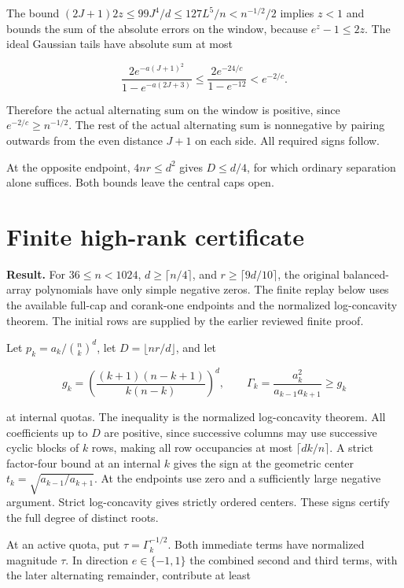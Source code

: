 \documentclass[11pt]{article}
\begin{document}
The bound $(2J+1)2z\le99J^4/d\le127L^5/n< n^{-1/2}/2$ implies $z<1$ and bounds the sum of the absolute errors on the window, because $e^z-1\le2z$. The ideal Gaussian tails have absolute sum at most

\begin{equation*}
\frac{2 e^{-a(J+1)^2}}{1-e^{-a(2J+3)}}\le \frac{2e^{-24/c}}{1-e^{-12}}< e^{-2/c}.
\end{equation*}

Therefore the actual alternating sum on the window is positive, since $e^{-2/c}\ge n^{-1/2}$. The rest of the actual alternating sum is nonnegative by pairing outwards from the even distance $J+1$ on each side. All required signs follow.

At the opposite endpoint, $4nr\le d^2$ gives $D\le d/4$, for which ordinary separation alone suffices. Both bounds leave the central caps open.

\section{Finite high-rank certificate}\label{sec:finite}

\textbf{Result.} For $36\le n<1024$, $d\ge\lceil n/4\rceil$, and $r\ge\lceil9d/10\rceil$, the original balanced-array polynomials have only simple negative zeros. The finite replay below uses the available full-cap and corank-one endpoints and the normalized log-concavity theorem. The initial rows are supplied by the earlier reviewed finite proof.

Let $p_k=a_k/\binom nk^d$, let $D=\lfloor nr/d\rfloor$, and let

\begin{equation*}
g_k=\left(\frac{(k+1)(n-k+1)}{k(n-k)}\right)^d, \qquad
\Gamma_k=\frac{a_k^2}{a_{k-1}a_{k+1}}\ge g_k
\end{equation*}

at internal quotas. The inequality is the normalized log-concavity theorem. All coefficients up to $D$ are positive, since successive columns may use successive cyclic blocks of $k$ rows, making all row occupancies at most $\lceil dk/n\rceil$. A strict factor-four bound at an internal $k$ gives the sign at the geometric center $t_k=\sqrt{a_{k-1}/a_{k+1}}$. At the endpoints use zero and a sufficiently large negative argument. Strict log-concavity gives strictly ordered centers. These signs certify the full degree of distinct roots.

At an active quota, put $\tau=\Gamma_k^{-1/2}$. Both immediate terms have normalized magnitude $\tau$. In direction $e\in\{-1,1\}$ the combined second and third terms, with the later alternating remainder, contribute at least
\end{document}
